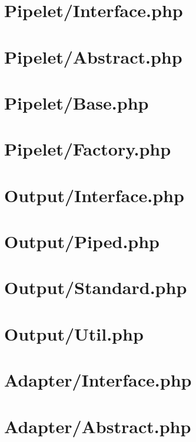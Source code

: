 \documentclass[12pt]{report}
\newcommand{\rootPath}{../../}
\newcommand{\rootServerPath}{\rootPath server/}
\newcommand{\rootServerPhpPath}{\rootServerPath php/}
\newcommand{\phplist}[1]{}
\begin{document}
\section{Pipelet/Interface.php}
\phplist{OpenPipe/Pipelet/Interface.php}

\section{Pipelet/Abstract.php}  
\phplist{OpenPipe/Pipelet/Abstract.php}

\section{Pipelet/Base.php} 
\phplist{OpenPipe/Pipelet/Base.php}

\section{Pipelet/Factory.php} 
\phplist{OpenPipe/Pipelet/Factory.php}

\section{Output/Interface.php} 
\phplist{OpenPipe/Output/Interface.php}

\section{Output/Piped.php} 
\phplist{OpenPipe/Output/Piped.php}

\section{Output/Standard.php} 
\phplist{OpenPipe/Output/Standard.php}

\section{Output/Util.php} 
\phplist{OpenPipe/Output/Util.php}

\section{Adapter/Interface.php} 
\phplist{OpenPipe/Adapter/Interface.php}

\section{Adapter/Abstract.php} 
\phplist{OpenPipe/Adapter/Abstract.php}
\end{document}
